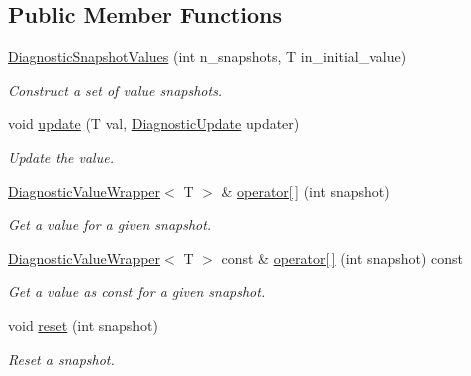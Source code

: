 \subsection*{Public Member Functions}
\begin{DoxyCompactItemize}
\item 
\hyperlink{structvt_1_1runtime_1_1component_1_1detail_1_1_diagnostic_snapshot_values_aed694eb0b124fda6f746855e83965a95}{Diagnostic\+Snapshot\+Values} (int n\+\_\+snapshots, T in\+\_\+initial\+\_\+value)
\begin{DoxyCompactList}\small\item\em Construct a set of value snapshots. \end{DoxyCompactList}\item 
void \hyperlink{structvt_1_1runtime_1_1component_1_1detail_1_1_diagnostic_snapshot_values_aeb6c8d74a72eba5610ba7d2ba966b91f}{update} (T val, \hyperlink{namespacevt_1_1runtime_1_1component_a896637e6e183a909a17bfd8d3943c206}{Diagnostic\+Update} updater)
\begin{DoxyCompactList}\small\item\em Update the value. \end{DoxyCompactList}\item 
\hyperlink{structvt_1_1runtime_1_1component_1_1detail_1_1_diagnostic_value_wrapper}{Diagnostic\+Value\+Wrapper}$<$ T $>$ \& \hyperlink{structvt_1_1runtime_1_1component_1_1detail_1_1_diagnostic_snapshot_values_a40036bbc9c217da754036c58bcce91b5}{operator\mbox{[}$\,$\mbox{]}} (int snapshot)
\begin{DoxyCompactList}\small\item\em Get a value for a given snapshot. \end{DoxyCompactList}\item 
\hyperlink{structvt_1_1runtime_1_1component_1_1detail_1_1_diagnostic_value_wrapper}{Diagnostic\+Value\+Wrapper}$<$ T $>$ const  \& \hyperlink{structvt_1_1runtime_1_1component_1_1detail_1_1_diagnostic_snapshot_values_a59ea89a8ada16ca5e96e10f418647963}{operator\mbox{[}$\,$\mbox{]}} (int snapshot) const
\begin{DoxyCompactList}\small\item\em Get a value as const for a given snapshot. \end{DoxyCompactList}\item 
void \hyperlink{structvt_1_1runtime_1_1component_1_1detail_1_1_diagnostic_snapshot_values_ac8bd81d164c5928dfd4213ddfd0d0206}{reset} (int snapshot)
\begin{DoxyCompactList}\small\item\em Reset a snapshot. \end{DoxyCompactList}\end{DoxyCompactItemize}
